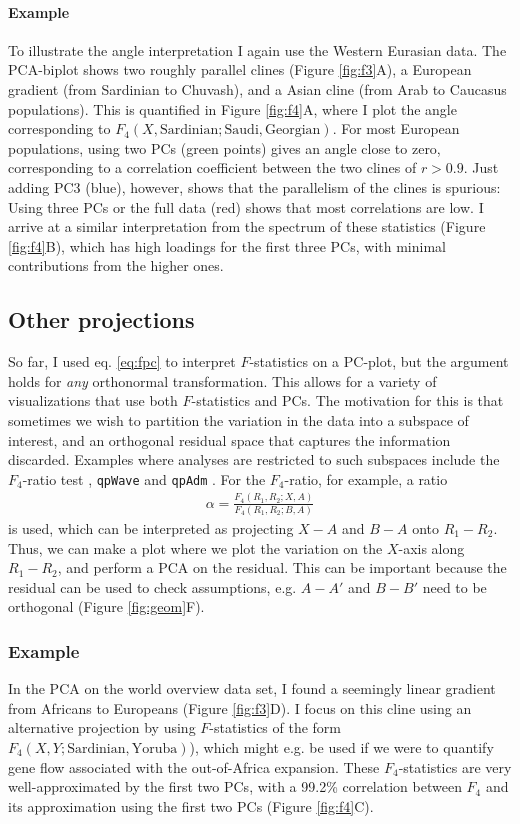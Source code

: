 \documentclass[12pt,fullpage, a4paper]{article}
\begin{document}
\paragraph{Example}
To illustrate the angle interpretation I again use the Western Eurasian data. The PCA-biplot shows two roughly parallel clines (Figure \ref{fig:f3}A), a European gradient (from Sardinian to Chuvash), and a Asian cline (from Arab to Caucasus populations). This is quantified in Figure \ref{fig:f4}A, where I plot the angle corresponding to $F_4(X, \text{Sardinian}; \text{Saudi}, \text{Georgian})$. For most European populations, using two PCs (green points) gives an angle close to zero, corresponding to a correlation coefficient between the two clines of $r>0.9$. Just adding PC3 (blue), however, shows that the parallelism of the clines is spurious: Using three PCs or the full data (red) shows that most correlations are low. I arrive at a similar interpretation from the spectrum of these statistics (Figure \ref{fig:f4}B), which has high loadings for the first three PCs, with minimal contributions from the higher ones.

\subsection{Other projections}
So far, I used eq. \ref{eq:fpc} to interpret $F$-statistics on a PC-plot, but the argument holds for \emph{any} orthonormal transformation. This allows for a variety of visualizations that use both $F$-statistics and PCs. The motivation for this is that sometimes we wish to partition the variation in the data into a subspace of interest, and an orthogonal residual space that captures the information discarded. Examples where analyses are restricted to such subspaces include the $F_4$-ratio test \citep{patterson2012, petr2019}, \texttt{qpWave} \citep{skoglund2015} and \texttt{qpAdm} \citep{harney2021}. For the $F_4$-ratio, for example, a ratio
\begin{eqnarray}
\alpha = \frac{F_4(R_1, R_2; X, A)}{F_4(R_1, R_2; B, A)}  \label{eq:f4ratio}
\end{eqnarray}
is used, which can be interpreted as projecting $X-A$ and $B-A$ onto $R_1 - R_2$. Thus, we can make a plot where we plot the variation on the $X$-axis along $R_1 - R_2$, and perform a PCA on the residual. This can be important because the residual can be used to check assumptions, e.g. $A - A'$ and $B - B'$ need to be orthogonal (Figure \ref{fig:geom}F).

\subsubsection{Example}
In the PCA on the world overview data set, I found a seemingly linear gradient from Africans to Europeans (Figure \ref{fig:f3}D). I focus on this cline using an alternative projection by using  $F$-statistics of the form $F_4(X, Y; \text{Sardinian}, \text{Yoruba})$), which might e.g. be used if we were to quantify gene flow associated with the out-of-Africa expansion. These $F_4$-statistics are very well-approximated by the first two PCs, with a 99.2\% correlation between $F_4$ and its approximation using the first two PCs (Figure \ref{fig:f4}C).
\end{document}

